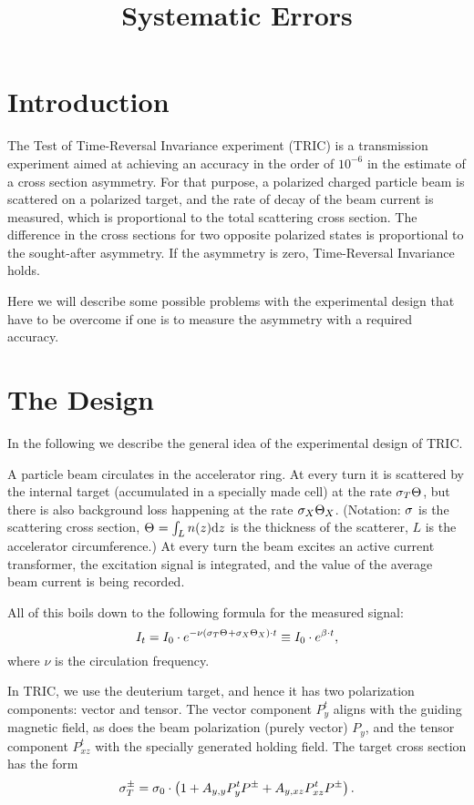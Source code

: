 \documentclass{article}
\begin{document}
\title{Systematic Errors}
\maketitle

\section*{Introduction}

The Test of Time-Reversal Invariance experiment (TRIC) is a transmission experiment aimed at achieving an accuracy in the order of $10^{-6}$ in the estimate of a cross section asymmetry. For that purpose, a polarized charged particle beam is scattered on a polarized target, and the rate of decay of the beam current is measured, which is proportional to the total scattering cross section. The difference in the cross sections for two opposite polarized states is proportional to the sought-after asymmetry. If the asymmetry is zero, Time-Reversal Invariance holds.

Here we will describe some possible problems with the experimental design that have to be overcome if one is to measure the asymmetry with a required accuracy.

\section{The Design}
In the following we describe the general idea of the experimental design of TRIC.

A particle beam circulates in the accelerator ring. At every turn it is scattered by the internal target (accumulated in a specially made cell) at the rate $\CS[T]\Thick$, but there is also background loss happening at the rate $\CS[X]\Thick[X]$. (Notation: $\CS$ is the scattering cross section, $\Thick = \int_L n(z)\td z$ is the thickness of the scatterer, $L$ is the accelerator circumference.) At every turn the beam excites an active current transformer, the excitation signal is integrated, and the value of the average beam current is being recorded. 

All of this boils down to the following formula for the measured signal:
\[
	I_t  = I_0 \cdot e^{-\nu\bkt{\CS[T]\Thick + \CS[X]\Thick[X]}\cdot t} \equiv I_0\cdot e^{\slp\cdot t},
\]
where $\nu$ is the circulation frequency.

In TRIC, we use the deuterium target, and hence it has two polarization components: vector and tensor. The vector component $P^t_y$ aligns with the guiding magnetic field, as does the beam polarization (purely vector) $P_y$, and the tensor component $P^t_{xz}$ with the specially generated holding field.  The target cross section has the form
\begin{equation}\label{eq:CrossSection}
	\CS[T]^\pm = \CS[0]\cdot\bkt{1 + \Ayy P^t_y P^\pm + \Ayxz P^t_{xz} P^\pm}.
\end{equation}
\end{document}
